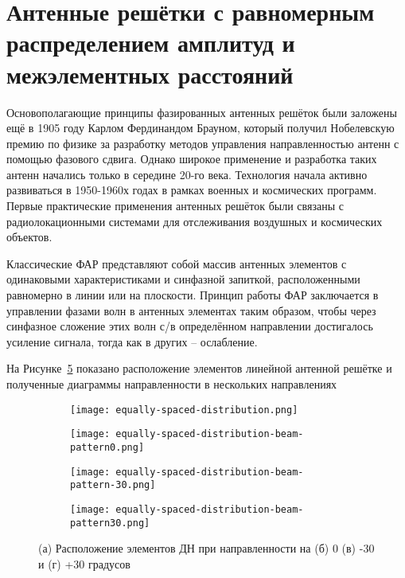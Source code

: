 \section{Антенные решётки с равномерным распределением амплитуд и межэлементных расстояний}\label{chap:equally-spaced-arrays}

Основополагающие принципы фазированных антенных решёток были заложены ещё в 1905 году Карлом Фердинандом Брауном,
который получил Нобелевскую премию по физике за разработку методов управления направленностью антенн
с помощью фазового сдвига. Однако широкое применение и разработка таких антенн начались только в середине 20-го века.
Технология начала активно развиваться в 1950-1960х годах в рамках военных и космических программ.
Первые практические применения антенных решёток были связаны с радиолокационными системами для отслеживания
воздушных и космических объектов. 

Классические ФАР представляют собой массив антенных элементов с одинаковыми характеристиками и синфазной запиткой,
расположенными равномерно в линии или на плоскости. Принцип работы ФАР заключается в управлении фазами волн
в антенных элементах таким образом, чтобы через синфазное сложение этих волн с/в определённом направлении достигалось
усиление сигнала, тогда как в других -- ослабление.

На Рисунке~\ref{fig:equally-spaced-distribution} 
показано расположение элементов линейной антенной решётке
и полученные диаграммы направленности в нескольких направлениях

\begin{figure}[!ht]
	\centering
	\begin{subfigure}[b]{0.8\textwidth}
		\centering
		\texttt{[image: equally-spaced-distribution.png]}
		\caption{}%
		\label{fig:equally-spaced-distribution-pos}
	\end{subfigure}
	\begin{subfigure}[b]{0.55\textwidth}
		\centering
		\texttt{[image: equally-spaced-distribution-beam-pattern0.png]}
		\caption{}%
		\label{fig:equally-spaced-distribution-beam-pattern0}
	\end{subfigure}
	\hfill
	\begin{subfigure}[b]{0.49\textwidth}
		\centering
		\texttt{[image: equally-spaced-distribution-beam-pattern-30.png]}
		\caption{}%
		\label{fig:equally-spaced-distribution-beam-pattern-30}
	\end{subfigure}
	\begin{subfigure}[b]{0.49\textwidth}
		\centering
		\texttt{[image: equally-spaced-distribution-beam-pattern30.png]}
		\caption{}%
		\label{fig:equally-spaced-distribution-beam-pattern30}
	\end{subfigure}
	\caption{%
	(а) Расположение элементов 
	ДН при направленности на 
	(б) 0 
	(в) -30 и 
	(г) +30 градусов
	}%
	\label{fig:equally-spaced-distribution}
\end{figure}

